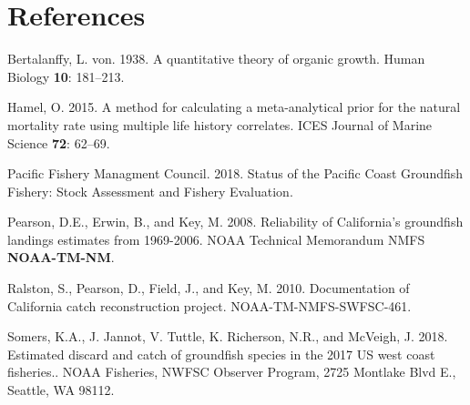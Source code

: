 \documentclass[12pt,]{article}
\begin{document}
\FloatBarrier

\FloatBarrier

\FloatBarrier

\FloatBarrier

\newpage

\color{black}

\section*{References}\label{references}

\renewcommand{\thepage}{}

\hypertarget{refs}{}
\hypertarget{ref-vonB1938}{}
Bertalanffy, L. von. 1938. A quantitative theory of organic growth.
Human Biology \textbf{10}: 181--213.

\hypertarget{ref-Hamel2015}{}
Hamel, O. 2015. A method for calculating a meta-analytical prior for the
natural mortality rate using multiple life history correlates. ICES
Journal of Marine Science \textbf{72}: 62--69.

\hypertarget{ref-PSMFC2018}{}
Pacific Fishery Managment Council. 2018. Status of the Pacific Coast
Groundfish Fishery: Stock Assessment and Fishery Evaluation.

\hypertarget{ref-Pearson2008}{}
Pearson, D.E., Erwin, B., and Key, M. 2008. Reliability of California's
groundfish landings estimates from 1969-2006. NOAA Technical Memorandum
NMFS \textbf{NOAA-TM-NM}.

\hypertarget{ref-Ralston2010}{}
Ralston, S., Pearson, D., Field, J., and Key, M. 2010. Documentation of
California catch reconstruction project. NOAA-TM-NMFS-SWFSC-461.

\hypertarget{ref-Somers2018}{}
Somers, K.A., J. Jannot, V. Tuttle, K. Richerson, N.R., and McVeigh, J.
2018. Estimated discard and catch of groundfish species in the 2017 US
west coast fisheries.. NOAA Fisheries, NWFSC Observer Program, 2725
Montlake Blvd E., Seattle, WA 98112.
\end{document}
